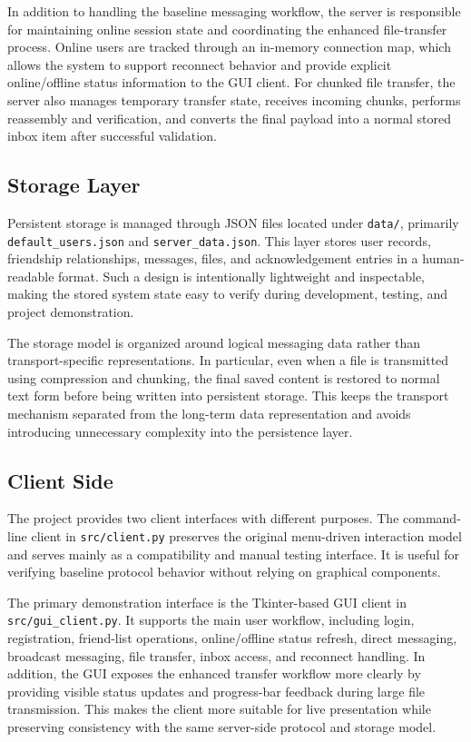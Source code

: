 \documentclass[conference]{IEEEtran}
\begin{document}
In addition to handling the baseline messaging workflow, the server is responsible for maintaining online session state and coordinating the enhanced file-transfer process. Online users are tracked through an in-memory connection map, which allows the system to support reconnect behavior and provide explicit online/offline status information to the GUI client. For chunked file transfer, the server also manages temporary transfer state, receives incoming chunks, performs reassembly and verification, and converts the final payload into a normal stored inbox item after successful validation.

\subsection{Storage Layer}
Persistent storage is managed through JSON files located under \texttt{data/}, primarily \texttt{default\_users.json} and \texttt{server\_data.json}. This layer stores user records, friendship relationships, messages, files, and acknowledgement entries in a human-readable format. Such a design is intentionally lightweight and inspectable, making the stored system state easy to verify during development, testing, and project demonstration.

The storage model is organized around logical messaging data rather than transport-specific representations. In particular, even when a file is transmitted using compression and chunking, the final saved content is restored to normal text form before being written into persistent storage. This keeps the transport mechanism separated from the long-term data representation and avoids introducing unnecessary complexity into the persistence layer.

\subsection{Client Side}
The project provides two client interfaces with different purposes. The command-line client in \texttt{src/client.py} preserves the original menu-driven interaction model and serves mainly as a compatibility and manual testing interface. It is useful for verifying baseline protocol behavior without relying on graphical components.

The primary demonstration interface is the Tkinter-based GUI client in \texttt{src/gui\_client.py}. It supports the main user workflow, including login, registration, friend-list operations, online/offline status refresh, direct messaging, broadcast messaging, file transfer, inbox access, and reconnect handling. In addition, the GUI exposes the enhanced transfer workflow more clearly by providing visible status updates and progress-bar feedback during large file transmission. This makes the client more suitable for live presentation while preserving consistency with the same server-side protocol and storage model.
\end{document}
